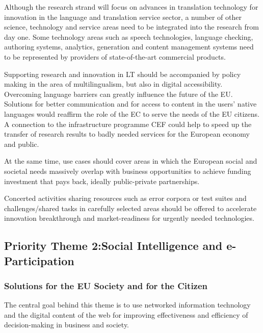 \documentclass[10pt, plain]{../../metanetpaper}
\begin{document}
\begin{multicols}{2}
Although the research strand will focus on advances in translation technology for innovation in the language and translation service sector, a number of other science, technology and service areas need to be integrated into the research from day one. Some technology areas such as speech technologies, language checking, authoring systems, analytics, generation and content management systems need to be represented by providers of state-of-the-art commercial products.
 
Supporting research and innovation in LT should be accompanied by policy making in the area of multilingualism, but also in digital accessibility. Overcoming language barriers can greatly influence the future of the EU. Solutions for better communication and for access to content in the users' native languages would reaffirm the role of the EC to serve the needs of the EU citizens. A connection to the infrastructure programme CEF could help to speed up the transfer of research results to badly needed services for the European economy and public.

At the same time, use cases should cover areas in which the European social and societal needs massively overlap with business opportunities to achieve funding investment that pays back, ideally public-private partnerships.
 
Concerted activities sharing resources such as error corpora or test suites and challenges/shared tasks in carefully selected areas should be offered to accelerate innovation breakthrough and market-readiness for urgently needed technologies.

\subsection[Priority Theme 2: Social Intelligence and e-Participation]{Priority Theme 2:\newline Social Intelligence and e-Participation}
\label{sec:priority-theme-2-social-intelligence}

\subsubsection{Solutions for the EU Society and for the Citizen}
\label{sec:solutions-eu-society-pt2}

The central goal behind this theme is to use networked information technology and the digital content of the web for improving effectiveness and efficiency of decision-making in business and society. 
 

\end{multicols}
\end{document}
